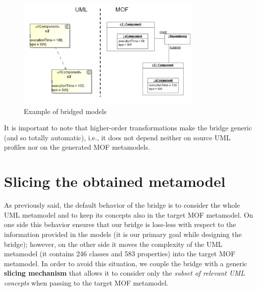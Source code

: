 \begin{figure}[htbp]
	\centering
		\includegraphics[width=0.80\textwidth]{figures/modelingExample.png}
	\caption{Example of bridged models}
	\label{fig:modelingExample}
\end{figure}
%
It is important to note that higher-order transformations make the bridge generic (and so totally automatic), i.e., it does not depend neither on source UML profiles nor on the generated MOF metamodels.



\section{Slicing the obtained metamodel}\label{sec:slicing}

As previously said, the default behavior of the bridge is to consider the whole UML metamodel and to keep its concepts also in the
target MOF metamodel. On one side this behavior ensures that our bridge is loss-less with respect to the information
provided in the models (it is our primary goal while designing the bridge);
however, on the other side it moves the complexity of the UML metamodel (it contains 246 classes and 583 properties)
into the target MOF metamodel. 
In order to avoid this situation, we couple the bridge with a generic \textbf{slicing mechanism} that allows it to consider  
only the \textit{subset of relevant UML concepts} when passing to the target MOF metamodel.

